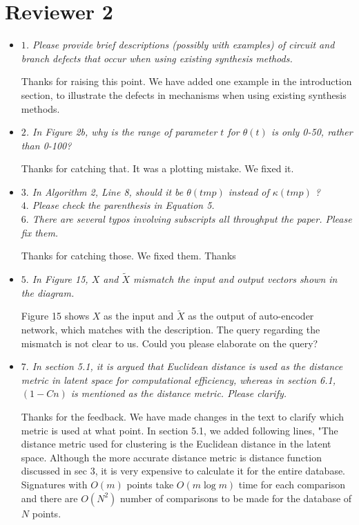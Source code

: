\documentclass{article}
\begin{document}
\section{Reviewer 2}

\begin{itemize}
  \item \emph{
$1$. Please provide brief descriptions (possibly with examples) of circuit and branch defects that
occur when using existing synthesis methods.
}

Thanks for raising this point.
We have added one example in the introduction section, to illustrate the defects in mechanisms when using existing synthesis methods.
\\

  \item \emph{
  $2$. In Figure 2b, why is the range of parameter $t$ for $\theta(t)$ is only 0-50, rather than 0-100?
}

Thanks for catching that. It was a plotting mistake. We fixed it.
\\

  \item \emph{
$3.$ In Algorithm 2, Line 8, should it be $\theta(tmp)$ instead of $\kappa(tmp)$ ?\\
$4.$ Please check the parenthesis in Equation 5.\\
$6.$ There are several typos involving subscripts all throughput the paper. Please fix them.
}

Thanks for catching those. We fixed them. Thanks
\\

  \item \emph{
$5.$ In Figure 15, $X$ and $\tilde{X}$ mismatch the input and output vectors shown in the diagram.
}

Figure 15 shows $X$ as the input and $\tilde{X}$ as the output of auto-encoder network, which matches with the description.
The query regarding the mismatch is not clear to us.
Could you please elaborate on the query?
\\


  \item \emph{
$7.$ In section 5.1, it is argued that Euclidean distance is used as the distance metric in latent space for
computational efficiency, whereas in section 6.1, $(1 − Cn)$ is mentioned as the distance
metric. Please clarify.
}

Thanks for the feedback. We have made changes in the text to clarify which metric is used at what point.
In section 5.1, we added following lines, "The distance metric used for clustering is the Euclidean distance in the latent space.
Although the more accurate distance metric is distance function discussed in sec 3, it is very expensive to calculate it for the entire database.
Signatures with ${O}(m)$ points take ${O}(m\log{}m)$ time for each comparison and there are ${O}(N^2)$ number of comparisons to be made for the database of $N$ points.


\end{itemize}
\end{document}
